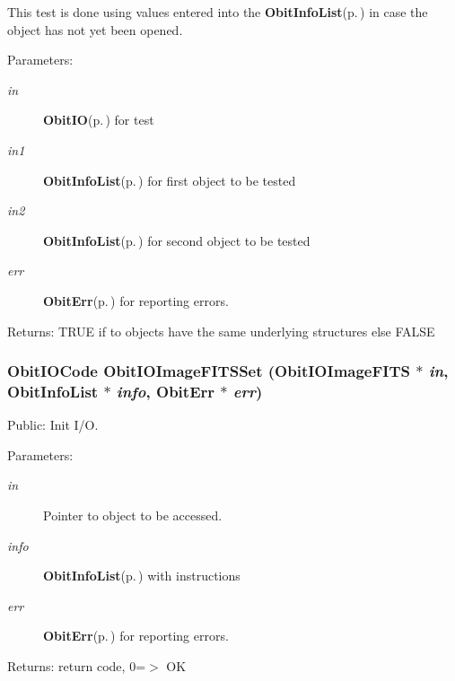 This test is done using values entered into the {\bf Obit\-Info\-List}{\rm (p.\,\pageref{structObitInfoList})} in case the object has not yet been opened. \begin{Desc}
\item[Parameters:]
\begin{description}
\item[{\em in}]{\bf Obit\-IO}{\rm (p.\,\pageref{structObitIO})} for test \item[{\em in1}]{\bf Obit\-Info\-List}{\rm (p.\,\pageref{structObitInfoList})} for first object to be tested \item[{\em in2}]{\bf Obit\-Info\-List}{\rm (p.\,\pageref{structObitInfoList})} for second object to be tested \item[{\em err}]{\bf Obit\-Err}{\rm (p.\,\pageref{structObitErr})} for reporting errors. \end{description}
\end{Desc}
\begin{Desc}
\item[Returns:]TRUE if to objects have the same underlying structures else FALSE \end{Desc}
\subsubsection{\setlength{\rightskip}{0pt plus 5cm}Obit\-IOCode Obit\-IOImage\-FITSSet ({\bf Obit\-IOImage\-FITS} $\ast$ {\em in}, {\bf Obit\-Info\-List} $\ast$ {\em info}, {\bf Obit\-Err} $\ast$ {\em err})}\label{ObitIOImageFITS_8h_a13}


Public: Init I/O. 

\begin{Desc}
\item[Parameters:]
\begin{description}
\item[{\em in}]Pointer to object to be accessed. \item[{\em info}]{\bf Obit\-Info\-List}{\rm (p.\,\pageref{structObitInfoList})} with instructions \item[{\em err}]{\bf Obit\-Err}{\rm (p.\,\pageref{structObitErr})} for reporting errors. \end{description}
\end{Desc}
\begin{Desc}
\item[Returns:]return code, 0=$>$ OK \end{Desc}
